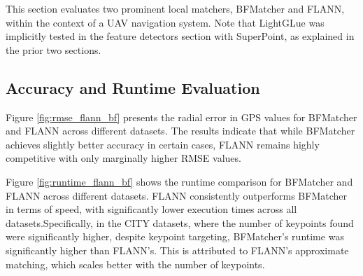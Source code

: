 This section evaluates two prominent local matchers, BFMatcher and FLANN, within the context of a UAV navigation system. Note that LightGLue was implicitly tested in the feature detectors section with SuperPoint, as explained in the prior two sections. 

\subsection{Accuracy and Runtime Evaluation}

Figure \ref{fig:rmse_flann_bf} presents the radial error in GPS values for BFMatcher and FLANN across different datasets. The results indicate that while BFMatcher achieves slightly better accuracy in certain cases, FLANN remains highly competitive with only marginally higher RMSE values.

Figure \ref{fig:runtime_flann_bf} shows the runtime comparison for BFMatcher and FLANN across different datasets. FLANN consistently outperforms BFMatcher in terms of speed, with significantly lower execution times across all datasets.Specifically, in the CITY datasets, where the number of keypoints found were significantly higher, despite keypoint targeting, BFMatcher's runtime was significantly higher than FLANN's. This is attributed to FLANN's approximate matching, which scales better with the number of keypoints.

